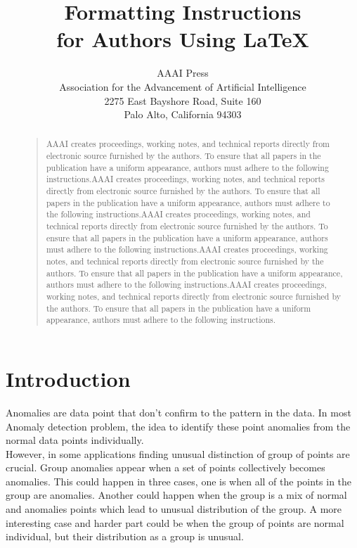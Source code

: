 \documentclass[letterpaper]{article}
\begin{document}
%
\title{Formatting Instructions \\for Authors Using \LaTeX{}}
\author{AAAI Press\\
Association for the Advancement of Artificial Intelligence\\
2275 East Bayshore Road, Suite 160\\
Palo Alto, California 94303\\
}
\maketitle
\begin{abstract}
\begin{quote}
AAAI creates proceedings, working notes, and technical reports directly from electronic source furnished by the authors. To ensure that all papers in the publication have a uniform appearance, authors must adhere to the following instructions.AAAI creates proceedings, working notes, and technical reports directly from electronic source furnished by the authors. To ensure that all papers in the publication have a uniform appearance, authors must adhere to the following instructions.AAAI creates proceedings, working notes, and technical reports directly from electronic source furnished by the authors. To ensure that all papers in the publication have a uniform appearance, authors must adhere to the following instructions.AAAI creates proceedings, working notes, and technical reports directly from electronic source furnished by the authors. To ensure that all papers in the publication have a uniform appearance, authors must adhere to the following instructions.AAAI creates proceedings, working notes, and technical reports directly from electronic source furnished by the authors. To ensure that all papers in the publication have a uniform appearance, authors must adhere to the following instructions. 
\end{quote}
\end{abstract}

\section{Introduction}
Anomalies are data point that don't confirm to the pattern in the data. In most Anomaly detection problem, the idea to identify these point anomalies from the normal data points individually. \\
However, in some applications finding unusual distinction of group of points are crucial. Group anomalies appear when a set of points collectively becomes anomalies. This could happen in three cases, one is when all of the points in the group are anomalies. Another could happen when the group is a mix of normal and anomalies points which lead to unusual distribution of the group. A more interesting case and harder part could be when the group of points are normal individual, but their distribution as a group is unusual. \\
\end{document}
